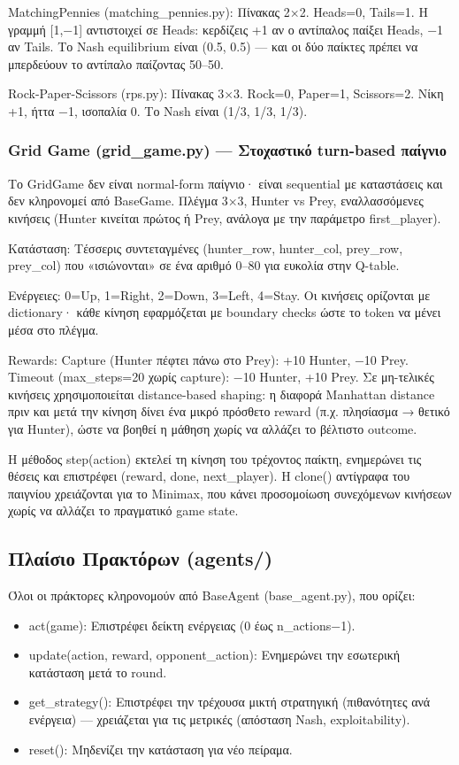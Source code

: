 \documentclass[11pt,a4paper]{article}
\newcommand{\eng}[1]{\foreignlanguage{english}{#1}}
\begin{document}
\eng{MatchingPennies} (\eng{matching\_pennies.py}): Πίνακας 2×2. Heads=0, Tails=1. Η γραμμή [1,−1] αντιστοιχεί σε Heads: κερδίζεις +1 αν ο αντίπαλος παίξει Heads, −1 αν Tails. Το Nash equilibrium είναι (0.5, 0.5) — και οι δύο παίκτες πρέπει να μπερδεύουν το αντίπαλο παίζοντας 50–50.

\eng{Rock-Paper-Scissors} (\eng{rps.py}): Πίνακας 3×3. Rock=0, Paper=1, Scissors=2. Νίκη +1, ήττα −1, ισοπαλία 0. Το Nash είναι (1/3, 1/3, 1/3).

\subsubsection{Grid Game (\eng{grid\_game.py}) — Στοχαστικό turn-based παίγνιο}

Το \eng{GridGame} δεν είναι normal-form παίγνιο· είναι sequential με καταστάσεις και δεν κληρονομεί από BaseGame. Πλέγμα 3×3, Hunter vs Prey, εναλλασσόμενες κινήσεις (Hunter κινείται πρώτος ή Prey, ανάλογα με την παράμετρο first\_player).

Κατάσταση: Τέσσερις συντεταγμένες (hunter\_row, hunter\_col, prey\_row, prey\_col) που «ισιώνονται» σε ένα αριθμό 0–80 για ευκολία στην Q-table.

Ενέργειες: 0=Up, 1=Right, 2=Down, 3=Left, 4=Stay. Οι κινήσεις ορίζονται με dictionary· κάθε κίνηση εφαρμόζεται με boundary checks ώστε το token να μένει μέσα στο πλέγμα.

Rewards: Capture (Hunter πέφτει πάνω στο Prey): +10 Hunter, −10 Prey. Timeout (max\_steps=20 χωρίς capture): −10 Hunter, +10 Prey. Σε μη-τελικές κινήσεις χρησιμοποιείται distance-based shaping: η διαφορά Manhattan distance πριν και μετά την κίνηση δίνει ένα μικρό πρόσθετο reward (π.χ. πλησίασμα → θετικό για Hunter), ώστε να βοηθεί η μάθηση χωρίς να αλλάζει το βέλτιστο outcome.

Η μέθοδος \eng{step(action)} εκτελεί τη κίνηση του τρέχοντος παίκτη, ενημερώνει τις θέσεις και επιστρέφει (reward, done, next\_player). Η \eng{clone()} αντίγραφα του παιγνίου χρειάζονται για το Minimax, που κάνει προσομοίωση συνεχόμενων κινήσεων χωρίς να αλλάζει το πραγματικό game state.

\subsection{Πλαίσιο Πρακτόρων (\eng{agents/})}

Όλοι οι πράκτορες κληρονομούν από \eng{BaseAgent} (\eng{base\_agent.py}), που ορίζει:

\begin{itemize}
\item \eng{act(game)}: Επιστρέφει δείκτη ενέργειας (0 έως n\_actions−1).
\item \eng{update(action, reward, opponent\_action)}: Ενημερώνει την εσωτερική κατάσταση μετά το round.
\item \eng{get\_strategy()}: Επιστρέφει την τρέχουσα μικτή στρατηγική (πιθανότητες ανά ενέργεια) — χρειάζεται για τις μετρικές (απόσταση Nash, exploitability).
\item \eng{reset()}: Μηδενίζει την κατάσταση για νέο πείραμα.
\end{itemize}
\end{document}
